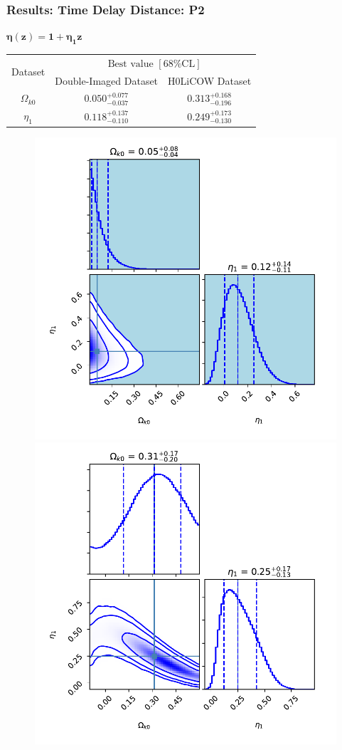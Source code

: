 \documentclass[xcolor=table,bigger]{beamer}
\begin{document}
\begin{frame}
 \frametitle{Results: Time Delay Distance: P2}
 $
{\boxed{\boldsymbol{\eta(z)=1+\eta_1z}}}
$
\begin{table}
  \begin{tabular}{|c|c|c|}
    \hline
    \multirow{2}{*}{Dataset} &
      \multicolumn{2}{c|}{${\text { Best value }[68 \% \mathrm{CL}]}$} \\
\cline{2-3}
    &Double-Imaged Dataset & H0LiCOW Dataset \\
    \hline
    $\Omega_{k0}$ & $ {0.050_{-0.037}^{+0.077}}$ &  $0.313^{+0.168}_{-0.196}$ \\
    \hline
    $ \eta_1$ &$ {0.118_{-0.110}^{+0.137}}$ & $0.249^{+0.173}_{-0.130}$  \\
       \hline
  \end{tabular}
\end{table}
%
 \begin{figure}[ht!]
\centering
\includegraphics[width=45 mm]{time_delay_12_GRB_Pantheon_2nd_poly_P2_without_H0}
\includegraphics[width=45 mm]{H0LiCOW_P2}
\end{figure} 
\end{frame}
\end{document}
